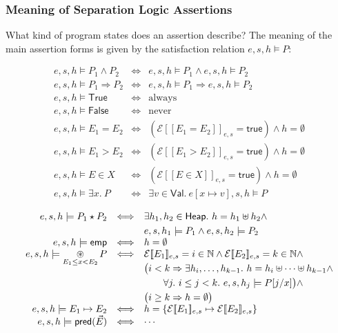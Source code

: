 \documentclass[11pt]{article}
\newcommand{\True}{\mathsf{True}}
\newcommand{\False}{\mathsf{False}}
\newcommand{\Emp}{\mathsf{emp}}
\newcommand{\Eval}[1]{\mathcal{E}[\![#1]\!]_{e,s}}
\newcommand{\Val}{\mathsf{Val}}
\newcommand{\Heap}{\mathsf{Heap}}
\newcommand{\Pred}{\mathsf{pred}}
\newcommand{\true}{\mathsf{true}}
\begin{document}
\subsubsection*{Meaning of Separation Logic Assertions}
What kind of program states does an assertion describe?
The meaning of the main assertion forms is given by the satisfaction relation
$e, s, h \models P$:

{\small
\[
\begin{array}{rcl}
e, s, h \models P_1 \land P_2
& \Longleftrightarrow &
e, s, h \models P_1 \land e, s, h \models P_2 \\
e, s, h \models P_1 \Rightarrow P_2
& \Longleftrightarrow &
e, s, h \models P_1 \Rightarrow e, s, h \models P_2 \\
e, s, h \models \True
& \Longleftrightarrow &
\text{always} \\
e, s, h \models \False
& \Longleftrightarrow &
\text{never} \\
e, s, h \models E_1 = E_2
& \Longleftrightarrow &
(\Eval{E_1 = E_2} = \true) \land h = \emptyset \\
e, s, h \models E_1 > E_2
& \Longleftrightarrow &
(\Eval{E_1 > E_2} = \true) \land h = \emptyset \\
e, s, h \models E \in X
& \Longleftrightarrow &
(\Eval{E \in X} = \true) \land h = \emptyset \\
e, s, h \models \exists x.\ P
& \Longleftrightarrow &
\exists v \in \Val.\ e[x \mapsto v], s, h \models P
\end{array}
\]
}

{\small\color{blue}
\[
\begin{array}{@{}rcl@{}}
e, s, h \models P_1 \star P_2
& \Longleftrightarrow &
\begin{aligned}[t]
& \exists h_1, h_2 \in \Heap.\ h = h_1 \uplus h_2 \land \\
& e, s, h_1 \models P_1 \land e, s, h_2 \models P_2
\end{aligned} \\
e, s, h \models \Emp
& \Longleftrightarrow &
h = \emptyset \\
e, s, h \models \displaystyle\mathop{\circledast}_{E_1 \le x < E_2} P
& \Longleftrightarrow &
\begin{aligned}[t]
& \Eval{E_1} = i \in \mathbb{N}
  \land \Eval{E_2} = k \in \mathbb{N} \land \\
& \bigl(i < k \Rightarrow
  \exists h_i, \ldots, h_{k-1}.\ h = h_i \uplus \cdots \uplus h_{k-1}
  \land \\
& \qquad \forall j.\ i \le j < k.\ e, s, h_j \models P[j/x]\bigr) \land \\
& \bigl(i \ge k \Rightarrow h = \emptyset\bigr)
\end{aligned} \\
e, s, h \models E_1 \mapsto E_2
& \Longleftrightarrow &
h = \{\Eval{E_1} \mapsto \Eval{E_2}\} \\
e, s, h \models \Pred(\vec{E})
& \Longleftrightarrow &
\cdots
\end{array}
\]
}
\end{document}
